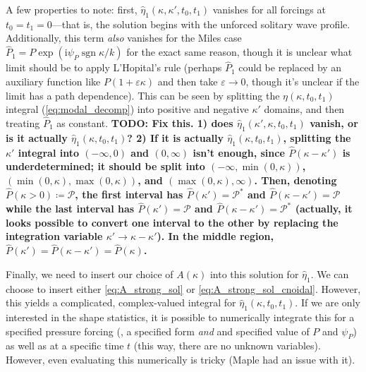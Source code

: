 \documentclass{jfm}
\newcommand{\POne}{\hat{P}_1}
\DeclareMathOperator{\sgn}{sgn}
\newcommand{\im}{\mathrm{i}}
\renewcommand*{\epsilon}{\varepsilon}
\begin{document}
A few properties to note: first,
$\hat{\eta}_1(\kappa,\kappa',t_0,t_1)$ vanishes for all forcings
at $t_0 = t_1 = 0$---that is, the solution begins with the
unforced solitary wave profile.
Additionally, this term \emph{also} vanishes for the Miles case $\POne = P
\exp(\im \psi_P \sgn{\kappa/k})$ for the exact same reason, though it is
unclear what limit should be to apply L'Hopital's rule (perhaps $\POne$
could be replaced by an auxiliary function like $P(1 + \epsilon \kappa)$
and then take $\epsilon \to 0$, though it's unclear if the limit has a
path dependence).
This can be seen by splitting the $\eta(\kappa,t_0,t_1)$ integral
(\cref{eq:modal_decomp}) into positive and negative $\kappa'$ domains,
and then treating $\POne$ as constant.
\textbf{TODO: Fix this. 1) does $\hat{\eta}_1(\kappa',\kappa,t_0,t_1)$ vanish,
or is it actually $\hat{\eta}_1(\kappa,t_0,t_1)$?
2) If it is actually $\hat{\eta}_1(\kappa,t_0,t_1)$, splitting the
$\kappa'$ integral into $(-\infty,0)$ and $(0,\infty)$ isn't enough,
since $\hat{P}(\kappa-\kappa')$ is underdetermined; it
should be split into $(-\infty,\min(0,\kappa))$,
$(\min(0,\kappa),\max(0,\kappa))$, and $(\max(0,\kappa),\infty)$.
Then, denoting $\hat{P}(\kappa>0) \coloneqq \mathcal{P}$, the first
interval has $\hat{P}(\kappa') = \mathcal{P}^*$ and
$\hat{P}(\kappa-\kappa') = \mathcal{P}$ while the last interval has
$\hat{P}(\kappa') = \mathcal{P}$ and
$\hat{P}(\kappa-\kappa') = \mathcal{P}^*$ (actually, it looks possible
to convert one interval to the other by replacing the integration
variable $\kappa' \to \kappa - \kappa'$).
In the middle region, $\hat{P}(\kappa') = \hat{P}(\kappa-\kappa') =
\hat{P}(\kappa)$.
}

Finally, we need to insert our choice of $A(\kappa)$ into this solution
for $\hat{\eta}_1$.
We can choose to insert either \cref{eq:A_strong_sol} or
\cref{eq:A_strong_sol_cnoidal}.
However, this yields a complicated, complex-valued integral for
$\hat{\eta}_1(\kappa,t_0,t_1)$.
If we are only interested in the shape statistics, it is possible to
numerically integrate this for a specified pressure forcing (\ie, a
specified form \emph{and} and specified value of $P$ and $\psi_P$) as
well as at a specific time $t$ (this way, there are no unknown
variables).
However, even evaluating this numerically is tricky (Maple had an issue
with it).
\end{document}
